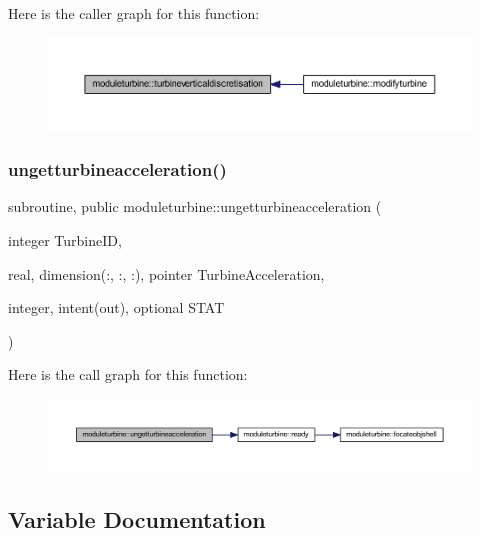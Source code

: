 Here is the caller graph for this function\+:\nopagebreak
\begin{figure}[H]
\begin{center}
\leavevmode
\includegraphics[width=350pt]{namespacemoduleturbine_a796f4418d909ff969c2d9169148e3414_icgraph}
\end{center}
\end{figure}
\mbox{\label{namespacemoduleturbine_ac345708176716a36f768cfd878d6a6b0}} 
\subsubsection{\texorpdfstring{ungetturbineacceleration()}{ungetturbineacceleration()}}
{\footnotesize\ttfamily subroutine, public moduleturbine\+::ungetturbineacceleration (\begin{DoxyParamCaption}\item[{integer}]{Turbine\+ID,  }\item[{real, dimension(\+:, \+:, \+:), pointer}]{Turbine\+Acceleration,  }\item[{integer, intent(out), optional}]{S\+T\+AT }\end{DoxyParamCaption})}

Here is the call graph for this function\+:\nopagebreak
\begin{figure}[H]
\begin{center}
\leavevmode
\includegraphics[width=350pt]{namespacemoduleturbine_ac345708176716a36f768cfd878d6a6b0_cgraph}
\end{center}
\end{figure}


\subsection{Variable Documentation}
\mbox{\label{namespacemoduleturbine_a858f94cb0c630187cc84a6e706f9ac32}} 
